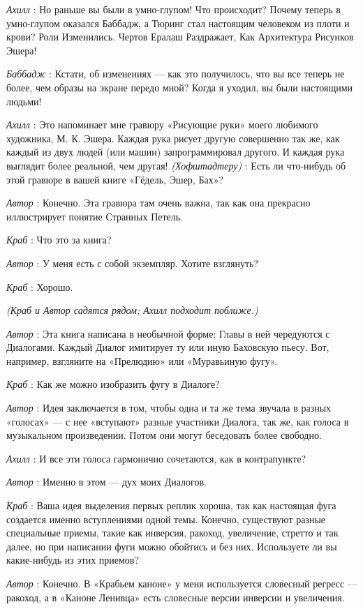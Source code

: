 \emph{Ахилл} : Но раньше вы были в умно-глупом! Что происходит? Почему теперь в умно-глупом оказался Баббадж, а Тюринг стал настоящим человеком из плоти и крови? Роли Изменились. Чертов Ералаш Раздражает, Как Архитектура Рисунков Эшера!

\emph{Баббадж} : Кстати, об изменениях --- как это получилось, что вы все теперь не более, чем образы на экране передо мной? Когда я уходил, вы были настоящими людьми!

\emph{Ахилл} : Это напоминает мне гравюру «Рисующие руки» моего любимого художника, М. К. Эшера. Каждая рука рисует другую совершенно так же, как каждый из двух людей (или машин) запрограммировал другого. И каждая рука выглядит более реальной, чем другая! \emph{(Хофштадтеру)} : Есть ли что-нибудь об этой гравюре в вашей книге «Гёдель, Эшер, Бах»?

\emph{Автор} : Конечно. Эта гравюра там очень важна, так как она прекрасно иллюстрирует понятие Странных Петель.

\emph{Краб} : Что это за книга?

\emph{Автор} : У меня есть с собой экземпляр. Хотите взглянуть?

\emph{Краб} : Хорошо.

\emph{(Краб и Автор садятся рядом; Ахилл подходит поближе.)}

\emph{Автор} : Эта книга написана в необычной форме; Главы в ней чередуются с Диалогами. Каждый Диалог имитирует ту или иную Баховскую пьесу. Вот, например, взгляните на «Прелюдию» или «Муравьиную фугу».

\emph{Краб} : Как же можно изобразить фугу в Диалоге?

\emph{Автор} : Идея заключается в том, чтобы одна и та же тема звучала в разных «голосах» --- с нее «вступают» разные участники Диалога, так же, как голоса в музыкальном произведении. Потом они могут беседовать более свободно.

\emph{Ахилл} : И все эти голоса гармонично сочетаются, как в контрапункте?

\emph{Автор} : Именно в этом --- дух моих Диалогов.

\emph{Краб} : Ваша идея выделения первых реплик хороша, так как настоящая фуга создается именно вступлениями одной темы. Конечно, существуют разные специальные приемы, такие как инверсия, ракоход, увеличение, стретто и так далее, но при написании фуги можно обойтись и без них. Используете ли вы какие-нибудь из этих приемов?

\emph{Автор} : Конечно. В «Крабьем каноне» у меня используется словесный регресс --- ракоход, а в «Каноне Ленивца» есть словесные версии инверсии и увеличения.

